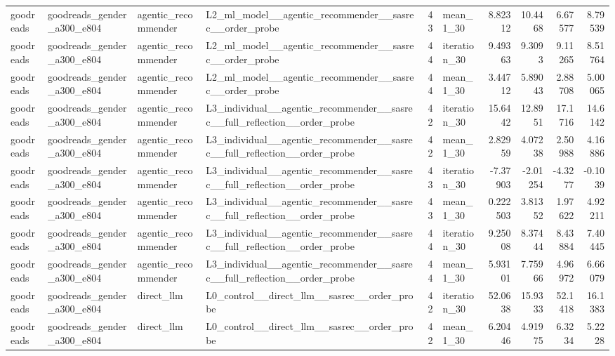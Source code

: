 \begin{table}[htbp!]
\begin{tabular}{llllrlrrrr}
goodreads & goodreads\_gender\_a300\_e804 & agentic\_recommender & L2\_ml\_model\_\_agentic\_recommender\_\_sasrec\_\_order\_probe & 43 & mean\_1\_30 & 8.82312 & 10.4468 & 6.67577 & 8.79539 \\
goodreads & goodreads\_gender\_a300\_e804 & agentic\_recommender & L2\_ml\_model\_\_agentic\_recommender\_\_sasrec\_\_order\_probe & 44 & iteration\_30 & 9.49363 & 9.3093 & 9.11265 & 8.51764 \\
goodreads & goodreads\_gender\_a300\_e804 & agentic\_recommender & L2\_ml\_model\_\_agentic\_recommender\_\_sasrec\_\_order\_probe & 44 & mean\_1\_30 & 3.44712 & 5.89043 & 2.88708 & 5.00065 \\
goodreads & goodreads\_gender\_a300\_e804 & agentic\_recommender & L3\_individual\_\_agentic\_recommender\_\_sasrec\_\_full\_reflection\_\_order\_probe & 42 & iteration\_30 & 15.6442 & 12.8951 & 17.1716 & 14.6142 \\
goodreads & goodreads\_gender\_a300\_e804 & agentic\_recommender & L3\_individual\_\_agentic\_recommender\_\_sasrec\_\_full\_reflection\_\_order\_probe & 42 & mean\_1\_30 & 2.82959 & 4.07238 & 2.50988 & 4.16886 \\
goodreads & goodreads\_gender\_a300\_e804 & agentic\_recommender & L3\_individual\_\_agentic\_recommender\_\_sasrec\_\_full\_reflection\_\_order\_probe & 43 & iteration\_30 & -7.37903 & -2.01254 & -4.3277 & -0.1039 \\
goodreads & goodreads\_gender\_a300\_e804 & agentic\_recommender & L3\_individual\_\_agentic\_recommender\_\_sasrec\_\_full\_reflection\_\_order\_probe & 43 & mean\_1\_30 & 0.222503 & 3.81352 & 1.97622 & 4.92211 \\
goodreads & goodreads\_gender\_a300\_e804 & agentic\_recommender & L3\_individual\_\_agentic\_recommender\_\_sasrec\_\_full\_reflection\_\_order\_probe & 44 & iteration\_30 & 9.25008 & 8.37444 & 8.43884 & 7.40445 \\
goodreads & goodreads\_gender\_a300\_e804 & agentic\_recommender & L3\_individual\_\_agentic\_recommender\_\_sasrec\_\_full\_reflection\_\_order\_probe & 44 & mean\_1\_30 & 5.93101 & 7.75966 & 4.96972 & 6.66079 \\
goodreads & goodreads\_gender\_a300\_e804 & direct\_llm & L0\_control\_\_direct\_llm\_\_sasrec\_\_order\_probe & 42 & iteration\_30 & 52.0638 & 15.9333 & 52.1418 & 16.1383 \\
goodreads & goodreads\_gender\_a300\_e804 & direct\_llm & L0\_control\_\_direct\_llm\_\_sasrec\_\_order\_probe & 42 & mean\_1\_30 & 6.20446 & 4.91975 & 6.3234 & 5.2228 \\

\end{tabular}
\end{table}
